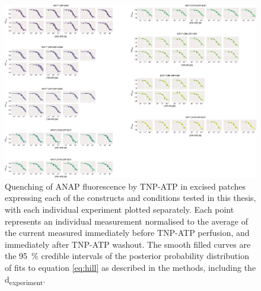 \begin{figure}[h]
	\centering
	\includegraphics[width=\textwidth]{all_pcf_fits_4.pdf}
	\caption[Excised patch quenching sample hill fits]{
	{\bf{}}
	Quenching of ANAP fluorescence by TNP-ATP in excised patches expressing each of the constructs and conditions tested in this thesis, with each individual experiment plotted separately.
	Each point represents an individual measurement normalised to the average of the current measured immediately before TNP-ATP perfusion, and immediately after TNP-ATP washout.
	The smooth filled curves are the \SI{95}{\percent} credible intervals of the posterior probability distribution of fits to equation \ref{eq:hill} as described in the methods, including the \textgreek{d}\textsubscript{experiment}.
	}
	\label{apxfig:pcf_2}
\end{figure}

